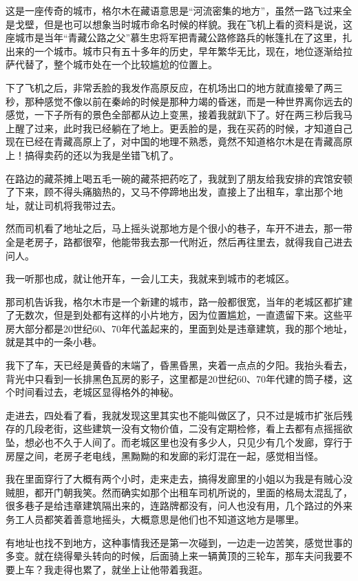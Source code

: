 这是一座传奇的城市，格尔木在藏语意思是“河流密集的地方”，虽然一路飞过来全是戈壁，但是也可以想象当时城市命名时候的样貌。我在飞机上看的资料是说，这座城市是当年“青藏公路之父”慕生忠将军把青藏公路修路兵的帐篷扎在了这里，扎出来的一个城市。城市只有五十多年的历史，早年繁华无比，现在，地位逐渐给拉萨代替了，整个城市处在一个比较尴尬的位置上。

下了飞机之后，非常丢脸的我发作高原反应，在机场出口的地方就直接晕了两三秒，那种感觉不像以前在秦岭的时候是那种力竭的昏迷，而是一种世界离你远去的感觉，一下子所有的景色全部都从边上变黑，接着我就趴下了。好在两三秒后我马上醒了过来，此时我已经躺在了地上。更丢脸的是，我在买药的时候，才知道自己现在已经在青藏高原上了，对中国的地理不熟悉，竟然不知道格尔木是在青藏高原上！搞得卖药的还以为我是坐错飞机了。

在路边的藏茶摊上喝五毛一碗的藏茶把药吃了，我就到了朋友给我安排的宾馆安顿了下来，顾不得头痛脑热的，又马不停蹄地出发，直接上了出租车，拿出那个地址，就让司机将我带过去。

然而司机看了地址之后，马上摇头说那地方是个很小的巷子，车开不进去，那一带全是老房子，路都很窄，他能带我去那一代附近，然后再往里去，就得我自己进去问人。

我一听那也成，就让他开车，一会儿工夫，我就来到城市的老城区。

那司机告诉我，格尔木市是一个新建的城市，路一般都很宽，当年的老城区都扩建了无数次，但是到处都有这样的小片地方，因为位置尴尬，一直遗留下来。这些平房大部分都是20世纪60、70年代盖起来的，里面到处是违章建筑，我的那个地址，就是其中的一条小巷。

我下了车，天已经是黄昏的末端了，昏黑昏黑，夹着一点点的夕阳。我抬头看去，背光中只看到一长排黑色瓦房的影子，这里都是20世纪60、70年代建的筒子楼，这个时间看过去，老城区显得格外的神秘。

走进去，四处看了看，我就发现这里其实也不能叫做区了，只不过是城市扩张后残存的几段老街，这些建筑一没有文物价值，二没有定期检修，看上去都有点摇摇欲坠，想必也不久于人间了。而老城区里也没有多少人，只见少有几个发廊，穿行于房屋之间，老房子老电线，黑黝黝的和发廊的彩灯混在一起，感觉相当怪。

我在里面穿行了大概有两个小时，走来走去，搞得发廊里的小姐以为我是有贼心没贼胆，都开门朝我笑。然而确实如那个出租车司机所说的，里面的格局太混乱了，很多巷子是给违章建筑隔出来的，连路牌都没有，问人也没有用，几个路过的外来务工人员都笑着善意地摇头，大概意思是他们也不知道这地方是哪里。

有地址也找不到地方，这种事情我还是第一次碰到，一边走一边苦笑，感觉世事的多变。就在绕得晕头转向的时候，后面骑上来一辆黄顶的三轮车，那车夫问我要不要上车？我走得也累了，就坐上让他带着我逛。

